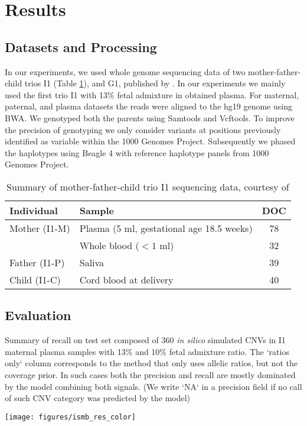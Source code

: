 \section{Results}

\subsection{Datasets and Processing}
\label{data}
In our experiments, we used whole genome sequencing data of two mother-father-child trios I1 (Table \ref{tab:I1}), and G1, published by \cite{kitzman2012}. In our experiments we mainly used the first trio I1 with 13\% fetal admixture in obtained plasma. For maternal, paternal, and plasma datasets the reads were aligned to the hg19 genome using BWA. We genotyped both the parents using Samtools and Vcftools. To improve the precision of genotyping we only consider variants at positions previously identified as variable within the 1000 Genomes Project.  Subsequently we phased the haplotypes using Beagle 4 \citep{browning2013} with reference haplotype panels from 1000 Genomes Project. 
\begin{table}
\caption{Summary of mother-father-child trio I1 sequencing data, courtesy of \cite{kitzman2012}  }
\label{tab:I1}
\centering
\footnotesize
\begin{tabular}{l|l|c}
\hline
Individual & Sample & DOC \\ \hline\hline
Mother (I1-M) & Plasma (5 ml, gestational age 18.5 weeks) & 78 \\
	& Whole blood ($<1$ ml) & 32 \\
Father (I1-P) & Saliva & 39 \\
Child (I1-C) & Cord blood at delivery & 40 \\
\hline
\end{tabular}
\end{table}

\subsection{Evaluation}
\begin{table*}
\caption{Summary of recall on test set composed of 360 \emph{in silico} simulated CNVs in I1 maternal plasma samples with 13\% and 10\% fetal admixture ratio. The `ratios only` column corresponds to the method that only uses allelic ratios, but not the coverage prior. In such cases both the precision and  recall are mostly dominated by the model combining both signals. (We write `NA` in a precision field if no call of such CNV category was predicted by the model)}
\label{tab:resRecall}
\centering
\texttt{[image: figures/ismb\_res\_color]}
\end{table*}

